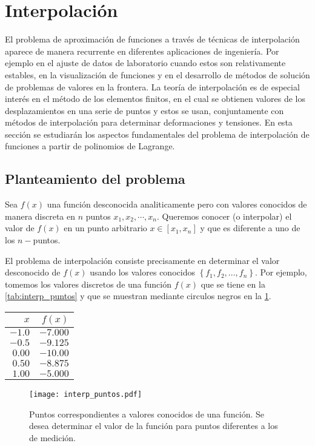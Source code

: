 \section{Interpolación}
El problema de aproximación de funciones a través de técnicas de interpolación aparece de manera recurrente en diferentes aplicaciones de ingeniería. Por ejemplo en el ajuste de datos de laboratorio cuando estos son relativamente estables, en la visualización de funciones y en el desarrollo de métodos de solución de problemas de valores en la frontera. La teoría de interpolación es de especial interés en el método de los elementos finitos, en el cual se obtienen valores de los desplazamientos en una serie de puntos y estos se usan, conjuntamente con métodos de interpolación para determinar deformaciones y tensiones. En esta sección se estudiarán los aspectos fundamentales del problema de interpolación de funciones a partir de polinomios de Lagrange. 
\subsection{Planteamiento del problema}

Sea $f(x)$ una función desconocida analiticamente pero con valores conocidos de manera discreta en $n$ puntos $x_1,  x_2, \cdots, x_n$. Queremos conocer (o interpolar) el valor de $f(x)$ en un punto arbitrario  $x \in [x_1, x_n]$ y que es diferente a uno de los $n-$puntos.

El problema de interpolación consiste precisamente en determinar el valor desconocido de $f(x)$ usando los valores conocidos $\left\{f_1,f_2,...,f_n\right\}$. Por ejemplo, tomemos los valores discretos de una función $f(x)$ que se tiene en la \cref{tab:interp_puntos} y que se muestran mediante circulos negros en la \cref{fig:interp_puntos}.

\begin{center}
	\begin{tabular}{rr}
		\hline
		$x$ & $f(x)$ \\
		\hline 
		$-1.0$  & $-7.000$  \\
		$-0.5$  & $-9.125$  \\
		$ 0.00$  & $-10.00$  \\
		$ 0.50$  & $-8.875$  \\
		$ 1.00$  & $-5.000$  \\
		\hline
	\end{tabular}
	\label{tab:interp_puntos}
\end{center}
%
\begin{figure}[H]
	\centering
	\texttt{[image: interp\_puntos.pdf]}
	\caption{Puntos correspondientes a valores conocidos de una función. Se desea determinar el valor de la función para puntos diferentes a los de medición.}
	\label{fig:interp_puntos}
\end{figure}


